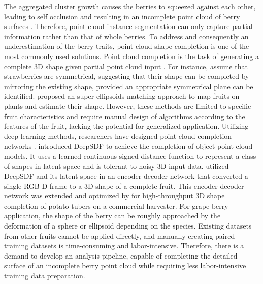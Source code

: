 \documentclass[12pt]{article}
\begin{document}
The aggregated cluster growth causes the berries to squeezed against each other, leading to self occlusion and resulting in an incomplete point cloud of berry surfaces \citep{du_instance_2023}. 
Therefore, point cloud instance segmentation can only capture partial information rather than that of whole berries.
To address  and consequently an underestimation of the berry traits, point cloud shape completion is one of the most commonly used solutions.
Point cloud completion is the task of generating a complete 3D shape given partial point cloud input \citep{tesema_point_2024}. 
For instance, \citet{ge_symmetrybased_2020} assume that strawberries are symmetrical, suggesting that their shape can be completed by mirroring the existing shape, provided an appropriate symmetrical plane can be identified.
\citet{marangoz_fruit_2022} proposed an super-ellipsoids matching approach to map fruits on plants and estimate their shape.
However, these methods are limited to specific fruit characteristics and require manual design of algorithms according to the features of the fruit, lacking the potential for generalized application.
Utilizing deep learning methods, researchers have designed point cloud completion networks \citep{wang_unsupervised_2021}. 
\citet{park_deepsdf_2019} introduced DeepSDF to achieve the completion of object point cloud models. It uses a learned continuous signed distance function to represent a class of shapes in latent space and is tolerant to noisy 3D input data. 
\citet{magistri_contrastive_2022} utilized DeepSDF and its latent space in an encoder-decoder network that converted a single RGB-D frame to a 3D shape of a complete fruit. 
This encoder-decoder network was extended and optimized by \citet{blok_highthroughput_2025} for high-throughput 3D shape completion of potato tubers on a commercial harvester. 
For grape berry application, the shape of the berry can be roughly approached by the deformation of a sphere or ellipsoid depending on the species. 
Existing datasets from other fruits cannot be applied directly, and manually creating paired training datasets is time-consuming and labor-intensive.
Therefore, there is a demand to develop an analysis pipeline, capable of completing the detailed surface of an incomplete berry point cloud while requiring less labor-intensive training data preparation.
\end{document}
